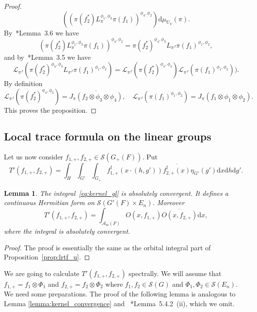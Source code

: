 \documentclass[letterpaper,11pt]{amsart}
\newcommand{\cA}{\mathcal{A}}
\newcommand{\cL}{\mathcal{L}}
\newcommand{\cS}{\mathcal{S}}
\newcommand{\rd}{\mathrm{d}}
\newcommand{\<}{\negthickspace}
\DeclareMathOperator{\U}{U}
\DeclareMathOperator{\rs}{rs}
\theoremstyle{definition}
\theoremstyle{plain}
\newtheorem{lemma}[definition]{Lemma}
\theoremstyle{remark}
\numberwithin{equation}{section}
\begin{document}
\begin{proof}
\[    \left( \left( \pi( f_2^*) L_{\pi}^{\phi_1, \phi_3} \pi(f_1) \right)^{\phi_4, \phi_2} \right)
    \rd \mu_{\U_V}(\pi).
    \]
By~\cite{Xue6}*{Lemma~3.6} we have
    \[
    ( \pi( f_2^*) L_{\pi}^{\phi_1, \phi_3} \pi(f_1))^{\phi_4, \phi_2} =
    \pi( f_2^*)^{\phi_4, \phi_3} L_{\pi^J} \pi(f_1)^{\phi_1, \phi_2},
    \]
and by~\cite{Xue6}*{Lemma~3.5} we have
    \[
    \cL_{\pi^J}(\pi( f_2^*)^{\phi_4, \phi_3} L_{\pi^J} \pi(f_1)^{\phi_1, \phi_2}) =
    \cL_{\pi^J}(\pi( f_2^*)^{\phi_4, \phi_3}) \cL_{\pi^J}(\pi(f_1)^{\phi_1, \phi_2})).
    \]
By definition
    \[
    \cL_{\pi^J}(\pi( f_2^*)^{\phi_4, \phi_3}) =
    \overline{J_{\pi}(f_2 \otimes \phi_3 \otimes \phi_4)}, \quad
    \cL_{\pi^J}(\pi(f_1)^{\phi_1, \phi_2}) =
    J_{\pi}(f_1 \otimes \phi_1 \otimes \phi_2).
    \]
This proves the proposition.
\end{proof}










\subsection{Local trace formula on the linear groups}


Let us now consider $f_{1, +}, f_{2, +} \in \cS(G_+(F))$. Put
    \begin{equation}    \label{eq:kernel_gl}
    T'(f_{1, +}, f_{2, +}) = \int_{H} \int_{G'} \int_{G_+}
    f_{1, +}^\dag(x \cdot (h, g')) \overline{f_{2, +}^\dag(x)}
    \eta_{G'}(g')
    \rd x \rd h \rd g'.
    \end{equation}

\begin{lemma}   \label{lemma:lrtf_gl_geometric}
The integral~\eqref{eq:kernel_gl} is absolutely convergent. It defines a
continuous Hermitian form on $\cS(G'(F) \times E_n)$. Moreover
    \begin{equation}    \label{eq:lrtf_gl_geometric}
    T'(f_{1, +}, f_{2, +}) = \int_{\cA_{\rs}(F)} O(x, f_{1, +})
    \overline{O(x, f_{2, +})} \rd x,
    \end{equation}
where the integral is absolutely convergent.
\end{lemma}

\begin{proof}
The proof is essentially the same as the orbital integral part of Proposition~\ref{prop:lrtf_u}.
\end{proof}

We are going to calculate $T'(f_{1, +}, f_{2, +})$ spectrally. We will assume
that $f_{1, +} = f_1 \otimes \Phi_1$ and $f_{2, +} = f_2 \otimes \Phi_2$
where $f_1, f_2 \in \cS(G)$ and $\Phi_1, \Phi_2 \in \cS(E_n)$. We need some
preparations. The proof of the following lemma is analogous to Lemma
\ref{lemma:kernel_convergence} and ~\cite{BP1}*{Lemma~5.4.2~(ii)}, which we
omit.
\end{document}
